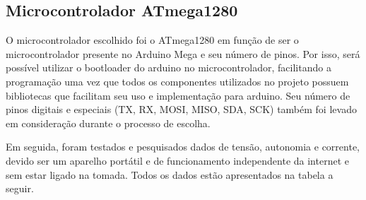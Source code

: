 \subsection{Microcontrolador ATmega1280}
O microcontrolador escolhido foi o ATmega1280 em função de ser o microcontrolador presente no Arduino Mega e seu número de pinos. Por isso, será possível utilizar o bootloader do arduino no microcontrolador, facilitando a programação uma vez que todos os componentes utilizados no projeto possuem bibliotecas que facilitam seu uso e implementação para arduino. Seu número de pinos digitais e especiais (TX, RX, MOSI, MISO, SDA, SCK) também foi levado em consideração durante o processo de escolha.

Em seguida, foram testados e pesquisados dados de tensão, autonomia e corrente, devido ser um aparelho portátil e de funcionamento independente da internet e sem estar ligado na tomada. Todos os dados estão apresentados na tabela a seguir.

